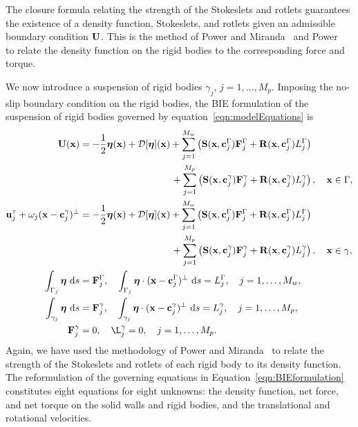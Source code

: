 \documentclass[preprint, 10pt]{elsarticle}
\begin{document}
The closure formula relating the strength of the Stokeslets and rotlets
guarantees the existence of a density function, Stokeslets, and rotlets
given an admissible boundary condition ${\mathbf{U}}$.  This is the method of
Power and Miranda~\cite{Power1987} and Power~\cite{Power1993} to
relate the density function on the rigid bodies to the corresponding
force and torque.

We now introduce a suspension of rigid bodies $\gamma_j$,
$j=1,\ldots,M_p$.  Imposing the no-slip boundary condition on the rigid
bodies, the BIE formulation of the suspension of rigid bodies governed
by equation~\eqref{eqn:modelEquations} is
\begin{subequations}
  \label{eqn:BIEformulation}
  \begin{align}
    \UU(\xx) &= -\frac{1}{2}\eeta(\xx) + \DD[\eeta](\xx) +
    \sum_{j=1}^{M_w} \left(\mathbf{S}(\xx,\cc^\Gamma_j)\FF^\Gamma_j + 
      \mathbf{R}(\xx,\cc^\Gamma_j)L^\Gamma_j\right)  \nonumber \\
&\hspace{96pt}+\sum_{j=1}^{M_p} \left(\mathbf{S}(\xx,\cc^\gamma_j)\FF^\gamma_j +
\mathbf{R}(\xx,\cc^\gamma_j)L^\gamma_j\right),
    \quad \xx \in \Gamma, \label{eqn:BIEformulation1} \\
  \uu^\tau_j + \omega_j(\xx - \cc_j^\gamma)^\perp &=
    -\frac{1}{2}\eeta(\xx) + \DD[\eeta](\xx) + 
    \sum_{j=1}^{M_w} \left(\mathbf{S}(\xx,\cc^\Gamma_j)\FF^\Gamma_j + 
      \mathbf{R}(\xx,\cc^\Gamma_j)L^\Gamma_j\right) \nonumber \\
&\hspace{96pt}+\sum_{j=1}^{M_p} \left(\mathbf{S}(\xx,\cc^\gamma_j)\FF^\gamma_j +
\mathbf{R}(\xx,\cc^\gamma_j)L^\gamma_j\right),
    \quad \xx \in \gamma, \label{eqn:BIEformulation2} \\
  \int_{\Gamma_j} \eeta~\text{d}s &= \FF^\Gamma_j, \quad
  \int_{\Gamma_j} \eeta\cdot (\xx - \cc^\Gamma_j)^\perp~\text{d}s =
  L^\Gamma_j, \quad j=1,\ldots,M_w, \label{eqn:BIEformulation3} \\
  \int_{\gamma_j} \eeta~\text{d}s &= \FF^\gamma_j, \quad
  \int_{\gamma_j} \eeta\cdot (\xx - \cc^\gamma_j)^\perp~\text{d}s =
  L^\gamma_j,\quad j=1,\ldots,M_p, \label{eqn:BIEformulation4} \\
  \FF^\gamma_j &= 0, \quad \L^\gamma_j = 0,\quad j=1,\ldots,M_p.
  \label{eqn:BIEformulation5}
\end{align}
\end{subequations}
Again, we have used the methodology of Power and
Miranda~\cite{Power1987, Power1993} to relate the strength of the Stokeslets and
rotlets of each rigid body to its density function. The reformulation
of the governing equations in Equation~\eqref{eqn:BIEformulation}
constitutes eight equations for eight unknowns: the density function,
net force, and net torque on the solid walls and rigid bodies, and the
translational and rotational velocities.  
\end{document}
